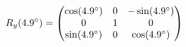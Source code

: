 \documentclass[preview]{standalone}
\begin{document}
\begin{align*}
\special{dvisvgm:raw <g id='unique000'>}R_y(4.9^\circ) = \begin{pmatrix} \cos(4.9^\circ) & 0 & -\sin(4.9^\circ) \\ 0 & 1 & 0 \\ \sin(4.9^\circ) & 0 & \cos(4.9^\circ) \end{pmatrix}\special{dvisvgm:raw </g>}
\end{align*}
\end{document}
